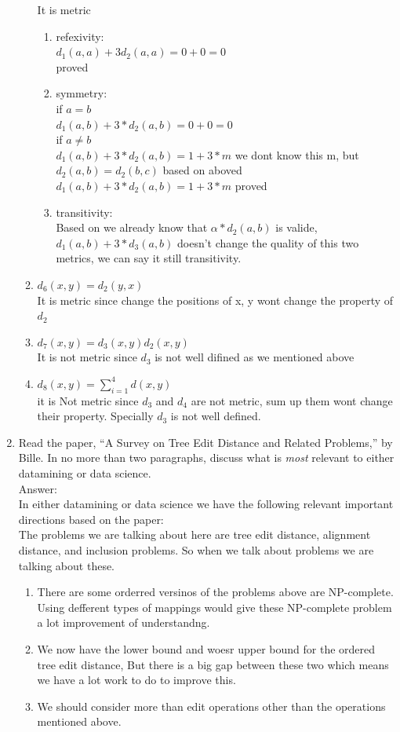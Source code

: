 \documentclass{article}
\begin{document}
\begin{enumerate}
\begin{enumerate}
It is metric
\begin{enumerate}
	\item refexivity:\\
	$d_1(a, a) + 3d_2(a,a) = 0 + 0 = 0$\\
	proved
	\item symmetry: \\
	if $a = b$\\
	$d_1(a,b) + 3 *d_2(a,b) = 0 + 0 = 0$\\
	if $a\neq b$\\
	$d_1(a,b) + 3 *d_2(a,b) = 1 + 3 * m$ we dont know this m, but $d_2(a,b) = d_2(b,c)$ based on aboved
	$d_1(a,b) + 3 *d_2(a,b) = 1 + 3 * m$
	proved
	\item transitivity:\\
	Based on we already know that $\alpha*d_2(a,b)$ is valide, $d_1(a,b) + 3 * d_3(a, b)$ doesn't change the quality of this two metrics, we can say it still transitivity.
\end{enumerate}
\item $d_6(x,y) = d_2(y,x)$\\
It is metric since change the positions of x, y wont change the property of $d_2$
\item $d_7(x,y) = d_3(x,y)d_2(x,y)$\\
It is not metric since $d_3$ is not well difined as we mentioned above
\item $d_8(x,y) = \sum_{i=1}^{4}d(x,y)$\\
it is Not metric since $d_3$ and $d_4$ are not metric, sum up them wont change their property. Specially $d_3$ is not well defined.
\end{enumerate}
\item Read the paper, ``A Survey on Tree Edit Distance and Related Problems,'' by Bille\cite{Bille:2005:STE:1085274.1085283}.  In no more than two paragraphs, discuss what is {\it most} relevant to either datamining or data science.\\
Answer:\\
In either datamining or data science we have the following relevant important directions based on the paper:\\
The problems we are talking about here are tree edit distance, alignment distance, and inclusion problems. So when we talk about problems we are talking about these.\\
\begin{enumerate}
	\item There are some orderred versinos of the problems above are NP-complete. Using defferent types of mappings would give these NP-complete problem a lot improvement of understandng.
	\item We now have the lower bound and woesr upper bound for the ordered tree edit distance, But there is a big gap between these two which means we have a lot work to do to improve this.
	\item We should consider more than edit operations other than the operations mentioned above. 
\end{enumerate}
\end{enumerate}
\end{document}
